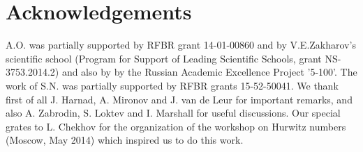 \documentclass[a4paper,10pt]{article}
\theoremstyle{plain}
\theoremstyle{remark}
\begin{document}
\section*{Acknowledgements}


A.O. was partially supported by RFBR grant 14-01-00860 and by V.E.Zakharov's scientific school
(Program for Support of Leading Scientific Schools, grant NS-3753.2014.2) and also by
by the  Russian Academic Excellence Project '5-100'.
The work of S.N. was partially supported by RFBR grants 15-52-50041.
We thank first of all J. Harnad, A. Mironov and J. van de Leur for important remarks, and also
A. Zabrodin,  S. Loktev and I. Marshall for useful discussions.
Our special grates to L. Chekhov for the organization of the workshop on Hurwitz numbers (Moscow, May 2014) which
inspired us to do this work.
\end{document}

